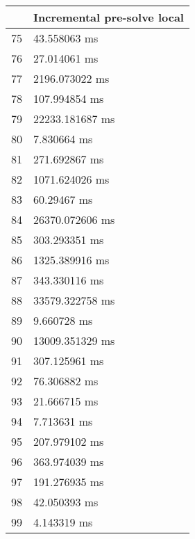 \begin{multicols}{2}
\begin{tabular}{|l|l|}
		\hline
		& Incremental pre-solve local \\ \hline
		75 & 43.558063 ms \\ \hline
		76 & 27.014061 ms \\ \hline
		77 & 2196.073022 ms \\ \hline
		78 & 107.994854 ms \\ \hline
		79 & 22233.181687 ms \\ \hline
		80 & 7.830664 ms \\ \hline
		81 & 271.692867 ms \\ \hline
		82 & 1071.624026 ms \\ \hline
		83 & 60.29467 ms \\ \hline
		84 & 26370.072606 ms \\ \hline
		85 & 303.293351 ms \\ \hline
		86 & 1325.389916 ms \\ \hline
		87 & 343.330116 ms \\ \hline
		88 & 33579.322758 ms \\ \hline
		89 & 9.660728 ms \\ \hline
		90 & 13009.351329 ms \\ \hline
		91 & 307.125961 ms \\ \hline
		92 & 76.306882 ms \\ \hline
		93 & 21.666715 ms \\ \hline
		94 & 7.713631 ms \\ \hline
		95 & 207.979102 ms \\ \hline
		96 & 363.974039 ms \\ \hline
		97 & 191.276935 ms \\ \hline
		98 & 42.050393 ms \\ \hline
		99 & 4.143319 ms \\ \hline
	\end{tabular}\\
\end{multicols}\pagebreak
